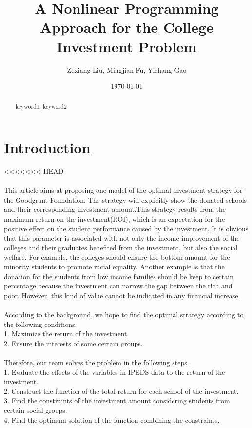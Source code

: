 \documentclass{mcmthesis}
\title{A Nonlinear Programming Approach for the College Investment Problem}
\author{Zexiang Liu, Mingjian Fu, Yichang Gao}
\date{\today}
\begin{document}
\begin{abstract}
\lipsum[1-2]

\begin{keywords}
keyword1; keyword2
\end{keywords}
\end{abstract}

\maketitle

\tableofcontents

\newpage

\section{Introduction}
<<<<<<< HEAD

\paragraph{} This article aims at proposing one model of the optimal investment strategy for the Goodgrant Foundation. The strategy will explicitly show the donated schools and their corresponding investment amount.This strategy results from the maximum return on the investment(ROI), which is an expectation for the positive effect on the student performance caused by the investment. It is obvious that this parameter is associated with not only the income improvement of the colleges and their graduates benefited from the investment, but also the social welfare. For example, the colleges should ensure the bottom amount for the minority students to promote racial equality. Another example is that the donation for the students from low income families should be keep to certain percentage because the investment can narrow the gap between the rich and poor. However, this kind of value cannot be indicated in any financial increase.
\paragraph{} According to the background, we hope to find the optimal strategy according to the following conditions.
\\ 	1. Maximize the return of the investment.
\\ 	2. Ensure the interests of some certain groups.
\paragraph{} Therefore, our team solves the problem in the following steps.
\\ 	1. Evaluate the effects of the variables in IPEDS data to the return of the investment.
\\  2. Construct the function of the total return for each school of the investment.
\\  3. Find the constraints of the investment amount considering students from certain social groups.
\\  4. Find the optimum solution of the function combining the  constraints.
\end{document}
